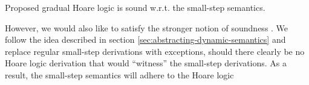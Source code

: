 Proposed gradual Hoare logic is sound w.r.t. the small-step semantics.

However, we would also like to satisfy the stronger notion of soundness .
We follow the idea described in section \ref{sec:abstracting-dynamic-semantics} and replace regular small-step derivations with exceptions, should there clearly be no Hoare logic derivation that would “witness” the small-step derivations.
As a result, the small-step semantics will adhere to the Hoare logic